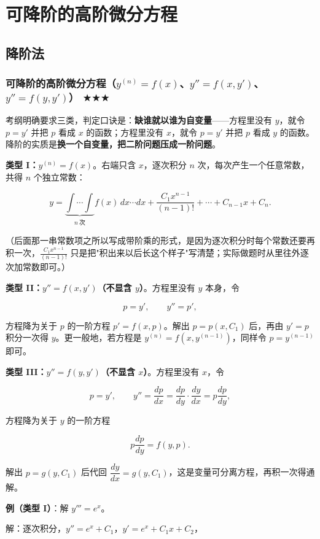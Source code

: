 \documentclass[11pt,openany,UTF8]{ctexbook}
\begin{document}
\section{可降阶的高阶微分方程}

\subsection{降阶法}

\subsubsection{可降阶的高阶微分方程（$y^{(n)}=f(x)$、$y''=f(x,y')$、$y''=f(y,y')$） $\bigstar$$\bigstar$$\bigstar$}

考纲明确要求三类，判定口诀是：\textbf{缺谁就以谁为自变量}——方程里没有 $y$，就令 $p=y'$ 并把 $p$ 看成 $x$ 的函数；方程里没有 $x$，就令 $p=y'$ 并把 $p$ 看成 $y$ 的函数。降阶的实质是\textbf{换一个自变量，把二阶问题压成一阶问题}。

\textbf{类型 I：$y^{(n)}=f(x)$}。右端只含 $x$，逐次积分 $n$ 次，每次产生一个任意常数，共得 $n$ 个独立常数：

\[y=\underbrace{\int\cdots\int}_{n\ \text{次}}f(x)\,dx\cdots dx+\frac{C_1x^{n-1}}{(n-1)!}+\cdots+C_{n-1}x+C_n .\]

（后面那一串常数项之所以写成带阶乘的形式，是因为逐次积分时每个常数还要再积一次，$\frac{C_1x^{n-1}}{(n-1)!}$ 只是把"积出来以后长这个样子"写清楚；实际做题时从里往外逐次加常数即可。）

\textbf{类型 II：$y''=f(x,y')$（不显含 $y$）}。方程里没有 $y$ 本身，令

\[p=y',\qquad y''=p',\]

方程降为关于 $p$ 的一阶方程 $p'=f(x,p)$。解出 $p=p(x,C_1)$ 后，再由 $y'=p$ 积分一次得 $y$。更一般地，若方程是 $y^{(n)}=f\left(x,y^{(n-1)}\right)$，同样令 $p=y^{(n-1)}$ 即可。

\textbf{类型 III：$y''=f(y,y')$（不显含 $x$）}。方程里没有 $x$，令

\[p=y',\qquad y''=\frac{dp}{dx}=\frac{dp}{dy}\cdot\frac{dy}{dx}=p\frac{dp}{dy},\]

方程降为关于 $y$ 的一阶方程

\[p\frac{dp}{dy}=f(y,p).\]

解出 $p=g(y,C_1)$ 后代回 $\dfrac{dy}{dx}=g(y,C_1)$，这是变量可分离方程，再积一次得通解。

\textbf{例（类型 I）}：解 $y'''=e^{x}$。

解：逐次积分，$y''=e^{x}+C_1$，$y'=e^{x}+C_1x+C_2$，
\end{document}

